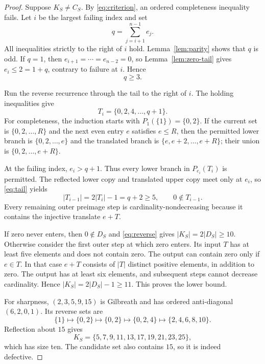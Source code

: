 \documentclass[11pt]{article}
\theoremstyle{remark}
\begin{document}
\begin{proof}
Suppose $K_S\ne C_S$.  By \eqref{eq:criterion}, an ordered completeness
inequality fails.  Let $i$ be the largest failing index and set
\[
 q=\sum_{j=i+1}^{n-1}e_j.
\]
All inequalities strictly to the right of $i$ hold.  Lemma~\ref{lem:parity}
shows that $q$ is odd.  If $q=1$, then
$e_{i+1}=\cdots=e_{n-2}=0$, so Lemma~\ref{lem:zero-tail} gives
$e_i\le2=1+q$, contrary to failure at $i$.  Hence
\begin{equation}\label{eq:qge3}
 q\ge3.
\end{equation}

Run the reverse recurrence through the tail to the right of $i$.  The
holding inequalities give
\begin{equation}\label{eq:tail}
 T_i=\{0,2,4,\ldots,q+1\}.
\end{equation}
For completeness, the induction starts with
$P_1(\{1\})=\{0,2\}$.  If the current set is
$\{0,2,\ldots,R\}$ and the next even entry $e$ satisfies $e\le R$, then
the permitted lower branch is $\{0,2,\ldots,e\}$ and the translated branch
is $\{e,e+2,\ldots,e+R\}$; their union is
$\{0,2,\ldots,e+R\}$.

At the failing index, $e_i>q+1$.  Thus every lower branch in
$P_{e_i}(T_i)$ is permitted.  The reflected lower copy and translated upper
copy meet only at $e_i$, so \eqref{eq:tail} yields
\begin{equation}\label{eq:five}
 |T_{i-1}|=2|T_i|-1=q+2\ge5,
 \qquad 0\notin T_{i-1}.
\end{equation}
Every remaining outer preimage step is cardinality-nondecreasing because it
contains the injective translate $e+T$.

If zero never enters, then $0\notin D_S$ and
\eqref{eq:reverse} gives $|K_S|=2|D_S|\ge10$.  Otherwise consider the first
outer step at which zero enters.  Its input $T$ has at least five elements
and does not contain zero.  The output can contain zero only if $e\in T$.
In that case $e+T$ consists of $|T|$ distinct positive elements, in addition
to zero.  The output has at least six elements, and subsequent steps cannot
decrease cardinality.  Hence
$|K_S|=2|D_S|-1\ge11$.  This proves the lower bound.

For sharpness, $(2,3,5,9,15)$ is Gilbreath and has ordered anti-diagonal
$(6,2,0,1)$.  Its reverse sets are
\[
 \{1\}\longmapsto\{0,2\}\longmapsto\{0,2\}
 \longmapsto\{0,2,4\}\longmapsto\{2,4,6,8,10\}.
\]
Reflection about $15$ gives
\[
 K_S=\{5,7,9,11,13,17,19,21,23,25\},
\]
which has size ten.  The candidate set also contains $15$, so it is indeed
defective.
\end{proof}
\end{document}
